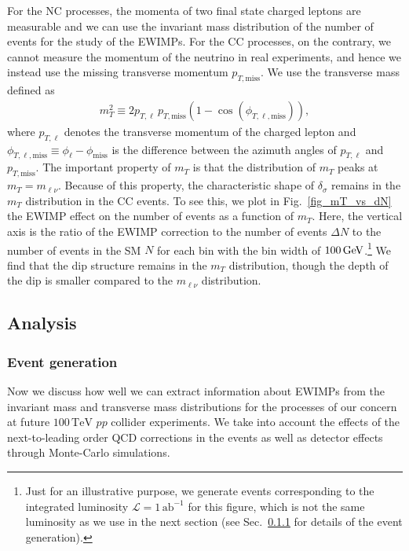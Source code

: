 \documentclass[12pt,twoside,book]{article}
\begin{document}
For the NC processes, the momenta of two final state charged leptons are
measurable and we can use the invariant mass distribution of the number
of events for the study of the EWIMPs.  For the CC processes, on the
contrary, we cannot measure the momentum of the neutrino in real
experiments, and hence we instead use the missing transverse momentum
$p_{T,\mathrm{miss}}$.  We use the transverse mass defined as
\begin{align}
 m_T^2 \equiv 2 p_{T, \ell}\,p_{T,\mathrm{miss}} \left( 1-\cos
 (\phi_{T,\ell,\mathrm{miss}}) \right),
\end{align}
where $p_{T, \ell}$ denotes the transverse momentum of the charged
lepton and $\phi_{T,\ell,\mathrm{miss}} \equiv \phi_{\ell} -
\phi_\mathrm{miss}$ is the difference between the azimuth angles of
$p_{T,\ell}$ and $p_{T,\mathrm{miss}}$.  The important property of $m_T$
is that the distribution of $m_T$ peaks at $m_T = m_{\ell\nu}$.  Because
of this property, the characteristic shape of $\delta_\sigma$ remains in
the $m_T$ distribution in the CC events.  To see this, we plot in
Fig.~\ref{fig_mT_vs_dN} the EWIMP effect on the number of events as a
function of $m_T$.  Here, the vertical axis is the ratio of the EWIMP
correction to the number of events $\Delta N$ to the number of events in
the SM $N$ for each bin with the bin width of $100\, {\rm GeV}$.\footnote{
  Just for an illustrative purpose, we generate events corresponding
  to the integrated luminosity $\mathcal{L} = 1\,\mathrm{ab}^{-1}$ for
  this figure, which is not the same luminosity as we use in the next
  section (see Sec.~\ref{sec_event} for details of the event
  generation).
} We find that the dip structure remains in the $m_T$ distribution,
though the depth of the dip is smaller compared to the $m_{\ell\nu}$
distribution.

\subsection{Analysis}
\label{sec:analysis}

\subsubsection{Event generation}
\label{sec_event}

Now we discuss how well we can extract information about EWIMPs from the
invariant mass and transverse mass distributions for the processes of
our concern at future $100\,\mathrm{TeV}$ $pp$ collider experiments.  We
take into account the effects of the next-to-leading order QCD
corrections in the events as well as detector effects through
Monte-Carlo simulations.
\end{document}
